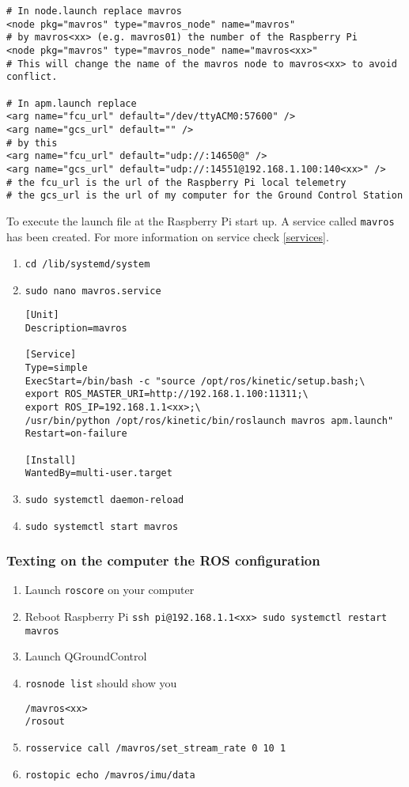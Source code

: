 \begin{verbatim}
# In node.launch replace mavros
<node pkg="mavros" type="mavros_node" name="mavros"
# by mavros<xx> (e.g. mavros01) the number of the Raspberry Pi
<node pkg="mavros" type="mavros_node" name="mavros<xx>"
# This will change the name of the mavros node to mavros<xx> to avoid conflict.

# In apm.launch replace
<arg name="fcu_url" default="/dev/ttyACM0:57600" />
<arg name="gcs_url" default="" />
# by this
<arg name="fcu_url" default="udp://:14650@" />
<arg name="gcs_url" default="udp://:14551@192.168.1.100:140<xx>" />
# the fcu_url is the url of the Raspberry Pi local telemetry
# the gcs_url is the url of my computer for the Ground Control Station
\end{verbatim}

To execute the launch file at the Raspberry Pi start up. A service called \texttt{mavros} has been created.
For more information on service check \ref{services}.

\begin{enumerate}
    \item \texttt{cd /lib/systemd/system}
    \item \texttt{sudo nano mavros.service}
          \begin{verbatim}
[Unit]
Description=mavros

[Service]
Type=simple
ExecStart=/bin/bash -c "source /opt/ros/kinetic/setup.bash;\
export ROS_MASTER_URI=http://192.168.1.100:11311;\
export ROS_IP=192.168.1.1<xx>;\
/usr/bin/python /opt/ros/kinetic/bin/roslaunch mavros apm.launch"
Restart=on-failure

[Install]
WantedBy=multi-user.target
                    \end{verbatim}
    \item \texttt{sudo systemctl daemon-reload}
    \item \texttt{sudo systemctl start mavros}
\end{enumerate}

\subsubsection{Texting on the computer the ROS configuration}
\begin{enumerate}
    \item Launch \texttt{roscore} on your computer
    \item Reboot Raspberry Pi \texttt{ssh pi@192.168.1.1<xx> sudo systemctl restart mavros}
    \item Launch QGroundControl
    \item \texttt{rosnode list} should show you

          \begin{verbatim}
/mavros<xx>
/rosout
          \end{verbatim}
    \item \texttt{rosservice call /mavros/set\_stream\_rate 0 10 1}
    \item \texttt{rostopic echo /mavros/imu/data}
\end{enumerate}


